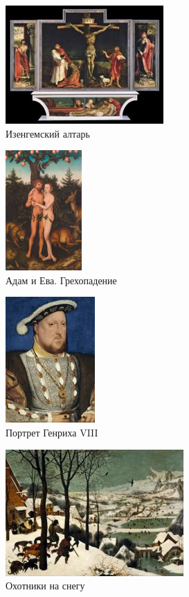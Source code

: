 \begin{figure}[ht]
    \centering
    \includegraphics{img/northern/5.jpg}
    \caption{Изенгемский алтарь}
    \label{fig:north:5}
\end{figure}

\begin{figure}[ht]
    \centering
    \includegraphics{img/northern/6.png}
    \caption{Адам и Ева. Грехопадение}
    \label{fig:north:6}
\end{figure}

\begin{figure}[ht]
    \centering
    \includegraphics{img/northern/7.jpg}
    \caption{Портрет Генриха VIII}
    \label{fig:north:7}
\end{figure}

\begin{figure}[ht]
    \centering
    \includegraphics{img/northern/8.jpg}
    \caption{Охотники на снегу}
    \label{fig:north:8}
\end{figure}

